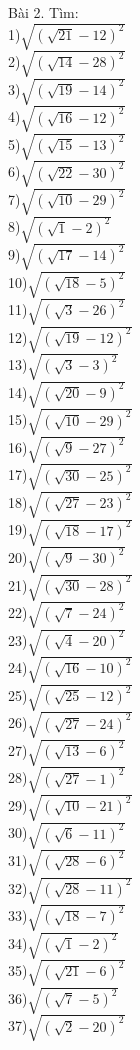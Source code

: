 \documentclass[12pt,a4paper]{article}
\begin{document}
Bài 2. Tìm:\\
1)$\sqrt{(\sqrt{21}-12)^2}$\\
2)$\sqrt{(\sqrt{14}-28)^2}$\\
3)$\sqrt{(\sqrt{19}-14)^2}$\\
4)$\sqrt{(\sqrt{16}-12)^2}$\\
5)$\sqrt{(\sqrt{15}-13)^2}$\\
6)$\sqrt{(\sqrt{22}-30)^2}$\\
7)$\sqrt{(\sqrt{10}-29)^2}$\\
8)$\sqrt{(\sqrt{1}-2)^2}$\\
9)$\sqrt{(\sqrt{17}-14)^2}$\\
10)$\sqrt{(\sqrt{18}-5)^2}$\\
11)$\sqrt{(\sqrt{3}-26)^2}$\\
12)$\sqrt{(\sqrt{19}-12)^2}$\\
13)$\sqrt{(\sqrt{3}-3)^2}$\\
14)$\sqrt{(\sqrt{20}-9)^2}$\\
15)$\sqrt{(\sqrt{10}-29)^2}$\\
16)$\sqrt{(\sqrt{9}-27)^2}$\\
17)$\sqrt{(\sqrt{30}-25)^2}$\\
18)$\sqrt{(\sqrt{27}-23)^2}$\\
19)$\sqrt{(\sqrt{18}-17)^2}$\\
20)$\sqrt{(\sqrt{9}-30)^2}$\\
21)$\sqrt{(\sqrt{30}-28)^2}$\\
22)$\sqrt{(\sqrt{7}-24)^2}$\\
23)$\sqrt{(\sqrt{4}-20)^2}$\\
24)$\sqrt{(\sqrt{16}-10)^2}$\\
25)$\sqrt{(\sqrt{25}-12)^2}$\\
26)$\sqrt{(\sqrt{27}-24)^2}$\\
27)$\sqrt{(\sqrt{13}-6)^2}$\\
28)$\sqrt{(\sqrt{27}-1)^2}$\\
29)$\sqrt{(\sqrt{10}-21)^2}$\\
30)$\sqrt{(\sqrt{6}-11)^2}$\\
31)$\sqrt{(\sqrt{28}-6)^2}$\\
32)$\sqrt{(\sqrt{28}-11)^2}$\\
33)$\sqrt{(\sqrt{18}-7)^2}$\\
34)$\sqrt{(\sqrt{1}-2)^2}$\\
35)$\sqrt{(\sqrt{21}-6)^2}$\\
36)$\sqrt{(\sqrt{7}-5)^2}$\\
37)$\sqrt{(\sqrt{2}-20)^2}$\\
\end{document}
